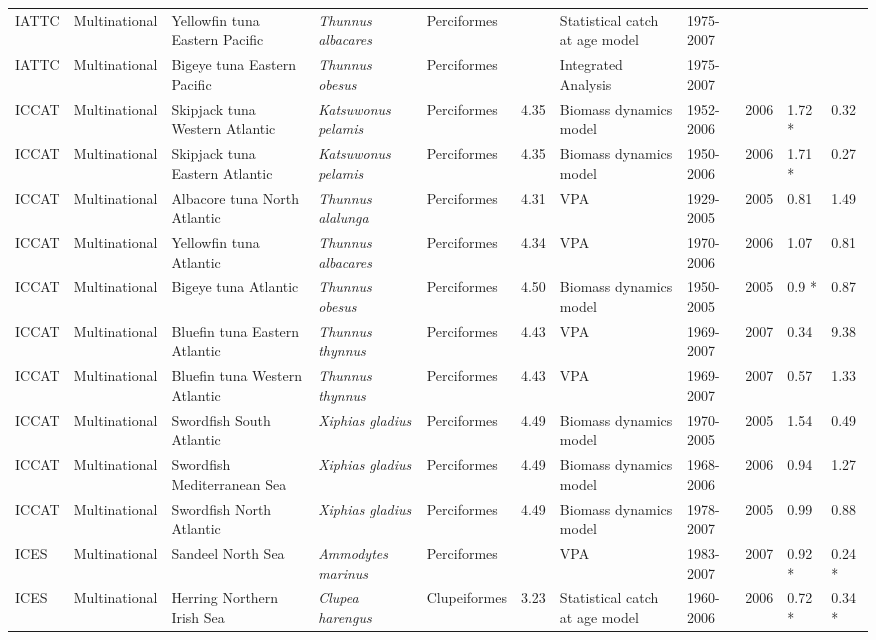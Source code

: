 \begin{longtable}{p{1.5cm}p{1.5cm}p{3cm}p{3cm}p{2.5cm}p{0.9cm}p{1.4cm}p{0.9cm}p{0.9cm}p{0.9cm}p{1cm}}
  IATTC & Multinational & Yellowfin tuna Eastern Pacific & \textit{Thunnus albacares} & Perciformes &  & Statistical catch at age model & 1975-2007 &  &  &  \\ 
  IATTC & Multinational & Bigeye tuna Eastern Pacific & \textit{Thunnus obesus} & Perciformes &  & Integrated Analysis & 1975-2007 &  &  &  \\ 
  ICCAT & Multinational & Skipjack tuna Western Atlantic & \textit{Katsuwonus pelamis} & Perciformes & 4.35 & Biomass dynamics model & 1952-2006 & 2006 & 1.72 * & 0.32 \\ 
  ICCAT & Multinational & Skipjack tuna Eastern Atlantic & \textit{Katsuwonus pelamis} & Perciformes & 4.35 & Biomass dynamics model & 1950-2006 & 2006 & 1.71 * & 0.27 \\ 
  ICCAT & Multinational & Albacore tuna North Atlantic & \textit{Thunnus alalunga} & Perciformes & 4.31 & VPA & 1929-2005 & 2005 & 0.81 & 1.49 \\ 
  ICCAT & Multinational & Yellowfin tuna Atlantic & \textit{Thunnus albacares} & Perciformes & 4.34 & VPA & 1970-2006 & 2006 & 1.07 & 0.81 \\ 
  ICCAT & Multinational & Bigeye tuna Atlantic & \textit{Thunnus obesus} & Perciformes & 4.50 & Biomass dynamics model & 1950-2005 & 2005 & 0.9 * & 0.87 \\ 
  ICCAT & Multinational & Bluefin tuna Eastern Atlantic & \textit{Thunnus thynnus} & Perciformes & 4.43 & VPA & 1969-2007 & 2007 & 0.34 & 9.38 \\ 
  ICCAT & Multinational & Bluefin tuna Western Atlantic & \textit{Thunnus thynnus} & Perciformes & 4.43 & VPA & 1969-2007 & 2007 & 0.57 & 1.33 \\ 
  ICCAT & Multinational & Swordfish South Atlantic & \textit{Xiphias gladius} & Perciformes & 4.49 & Biomass dynamics model & 1970-2005 & 2005 & 1.54 & 0.49 \\ 
  ICCAT & Multinational & Swordfish Mediterranean Sea & \textit{Xiphias gladius} & Perciformes & 4.49 & Biomass dynamics model & 1968-2006 & 2006 & 0.94 & 1.27 \\ 
  ICCAT & Multinational & Swordfish North Atlantic & \textit{Xiphias gladius} & Perciformes & 4.49 & Biomass dynamics model & 1978-2007 & 2005 & 0.99 & 0.88 \\ 
  ICES & Multinational & Sandeel North Sea & \textit{Ammodytes marinus} & Perciformes &  & VPA & 1983-2007 & 2007 & 0.92 * & 0.24 * \\ 
  ICES & Multinational & Herring Northern Irish Sea & \textit{Clupea harengus} & Clupeiformes & 3.23 & Statistical catch at age model & 1960-2006 & 2006 & 0.72 * & 0.34 * \\ 

\end{longtable}
